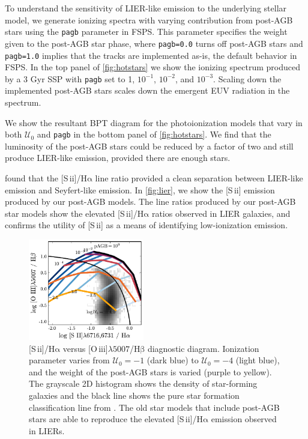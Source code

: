 \documentclass[linenumbers, tighten, trackchanges]{aastex61}%
\newcommand{\Fig}[1]{\autoref{fig:#1}}
\newcommand{\FSPS}{{\sc FSPS}\xspace}
\newcommand{\sii}{[S\,{\sc ii}]\xspace}
\newcommand{\oiii}{[O\,{\sc iii}]\xspace}
\newcommand{\ha}{\ensuremath{\mathrm{H\alpha}}}
\newcommand{\hb}{\ensuremath{\mathrm{H\beta}}}
\newcommand\lam[1]{\ensuremath{\lambda #1}}
\newcommand{\U}{\ensuremath{\mathcal{U}_{0}}}
\newcommand\oiiihb{\oiii{}\lam{5007}/\hb{}}
\begin{document}
To understand the sensitivity of LIER-like emission to the underlying stellar model, we generate ionizing spectra with varying contribution from post-AGB stars using the {\tt pagb} parameter in \FSPS. This parameter specifies the weight given to the post-AGB star phase, where {\tt pagb=0.0} turns off post-AGB stars and {\tt pagb=1.0} implies that the \citet{Vassiliadis} tracks are implemented as-is, the default behavior in \FSPS. In the top panel of \Fig{hotstars} we show the ionizing spectrum produced by a 3 Gyr SSP with {\tt pagb} set to 1, $10^{-1}$, $10^{-2}$, and $10^{-3}$. Scaling down the implemented post-AGB stars scales down the emergent EUV radiation in the spectrum.

We show the resultant BPT diagram for the photoionization models that vary in both \U{} and {\tt pagb} in the bottom panel of \Fig{hotstars}. We find that the luminosity of the post-AGB stars could be reduced by a factor of two and still produce LIER-like emission, provided there are enough stars.

\citet{Belfiore16} found that the \sii{}/\ha{} line ratio provided a clean separation between LIER-like emission and Seyfert-like emission. In \Fig{lier}, we show the \sii{} emission produced by our post-AGB models. The line ratios produced by our post-AGB star models show the elevated \sii{}/\ha{} ratios observed in LIER galaxies, and confirms the utility of \sii{} as a means of identifying low-ionization emission.

\begin{figure}[!htbp]
  \begin{centering}
    \includegraphics[width=0.45\textwidth]{f29.pdf}
    \caption{\sii{}/\ha{} versus \oiiihb{} diagnostic diagram. Ionization parameter varies from $\U=-1$ (dark blue) to $\U=-4$ (light blue), and the weight of the post-AGB stars is varied (purple to yellow). The grayscale 2D histogram shows the density of star-forming galaxies and the black line shows the pure star formation classification line from \citet{Kauffmann03a}. The old star models that include post-AGB stars are able to reproduce the elevated \sii{}/\ha{} emission observed in LIERs.}
    \label{fig:lier}
  \end{centering}
\end{figure}
\end{document}
